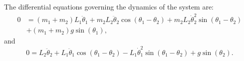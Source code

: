 The differential equations governing the dynamics of the system are:
\begin{equation}
	\begin{aligned}
		0 & = \left(m_{1}+m_{2}\right)L_{1}\ddot{\theta}_{1} + m_{2}L_{2}\ddot{\theta}_{2}\cos\left(\theta_{1}-\theta_{2}\right) + m_{2}L_{2}\dot{\theta}_{2}^{2}\sin\left(\theta_{1}-\theta_{2}\right) \\
		  & + \left(m_{1}+m_{2}\right)g\sin\left(\theta_{1}\right),
	\end{aligned}
\end{equation}
and
\begin{equation}
	0 = L_{2}\ddot{\theta}_{2}+L_{1}\ddot{\theta}_{1}\cos\left(\theta_{1}-\theta_{2}\right) - L_{1}\dot{\theta}_{1}^{2}\sin\left(\theta_{1}-\theta_{2}\right) + g\sin\left(\theta_{2}\right).
\end{equation}

